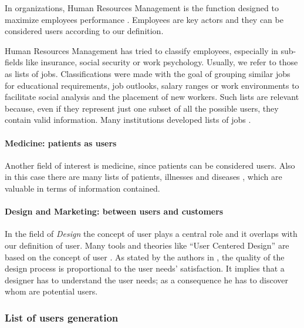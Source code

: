 \documentclass[]{book}
\let\oldparagraph\paragraph
\renewcommand{\paragraph}[1]{\oldparagraph{#1}\mbox{}}
\begin{document}
In organizations, Human Resources Management is the function designed to
maximize employees performance \citep{HRM}. Employees are key actors and
they can be considered users according to our definition.

Human Resources Management has tried to classify employees, especially
in sub-fields like insurance, social security or work psychology.
Usually, we refer to those as lists of jobs. Classifications were made
with the goal of grouping similar jobs for educational requirements, job
outlooks, salary ranges or work environments to facilitate social
analysis and the placement of new workers. Such lists are relevant
because, even if they represent just one subset of all the possible
users, they contain valid information. Many institutions developed lists
of jobs \citep{listjobs}.

\paragraph{Medicine: patients as
users}\label{medicine-patients-as-users}

Another field of interest is medicine, since patients can be considered
users. Also in this case there are many lists of patients, illnesses and
diseases \citep{cdcdiseases}, which are valuable in terms of information
contained.

\paragraph{Design and Marketing: between users and
customers}\label{design-and-marketing-between-users-and-customers}

In the field of \emph{Design} the concept of user plays a central role
and it overlaps with our definition of user. Many tools and theories
like ``User Centered Design'' are based on the concept of user
\citep{ucd}. As stated by the authors in \citep{npdul}, the quality of
the design process is proportional to the user needs' satisfaction. It
implies that a designer has to understand the user needs; as a
consequence he has to discover whom are potential users.

\subsubsection{List of users generation}\label{sourc}
\end{document}
